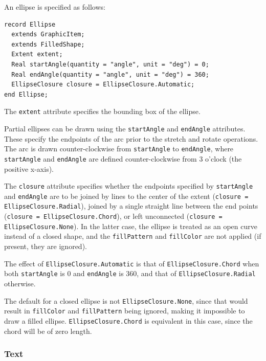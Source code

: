 An ellipse is specified as follows:
\begin{lstlisting}[language=modelica]
record Ellipse
  extends GraphicItem;
  extends FilledShape;
  Extent extent;
  Real startAngle(quantity = "angle", unit = "deg") = 0;
  Real endAngle(quantity = "angle", unit = "deg") = 360;
  EllipseClosure closure = EllipseClosure.Automatic;
end Ellipse;
\end{lstlisting}%
The \lstinline!extent! attribute specifies the bounding box of the ellipse.

Partial ellipses can be drawn using the \lstinline!startAngle! and \lstinline!endAngle! attributes.
These specify the endpoints of the arc prior to the stretch and rotate operations.
The arc is drawn counter-clockwise from \lstinline!startAngle! to \lstinline!endAngle!, where \lstinline!startAngle! and \lstinline!endAngle! are defined counter-clockwise from 3 o'clock (the positive x-axis).

The \lstinline!closure! attribute specifies whether the endpoints specified by \lstinline!startAngle! and \lstinline!endAngle! are to be joined by lines to the center of the extent (\lstinline!closure = EllipseClosure.Radial!), joined by a single straight line between the end points (\lstinline!closure = EllipseClosure.Chord!), or left unconnected (\lstinline!closure = EllipseClosure.None!).
In the latter case, the ellipse is treated as an open curve instead of a closed shape, and the \lstinline!fillPattern! and \lstinline!fillColor! are not applied (if present, they are ignored).

The effect of \lstinline!EllipseClosure.Automatic! is that of \lstinline!EllipseClosure.Chord! when both \lstinline!startAngle! is 0 and \lstinline!endAngle! is 360, and that of \lstinline!EllipseClosure.Radial! otherwise.

\begin{nonnormative}
The default for a closed ellipse is not \lstinline!EllipseClosure.None!, since that would result in \lstinline!fillColor! and \lstinline!fillPattern! being ignored, making it impossible to draw a filled ellipse.
\lstinline!EllipseClosure.Chord! is equivalent in this case, since the chord will be of zero length.
\end{nonnormative}

\subsubsection{Text}\label{text}

